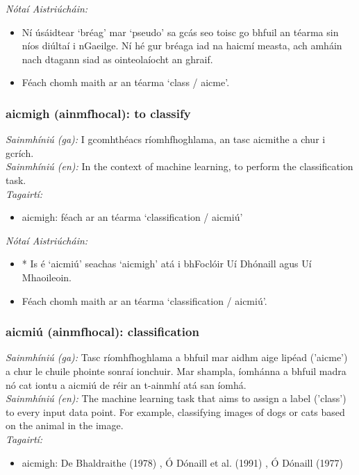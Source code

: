  \noindent \textit{Nótaí Aistriúcháin:}
\begin{itemize}
	\item Ní úsáidtear `bréag' mar `pseudo' sa gcás seo toisc go bhfuil an téarma sin níos diúltaí i nGaeilge. Ní hé gur bréaga iad na haicmí measta, ach amháin nach dtagann siad as ointeolaíocht an ghraif.
	\item Féach chomh maith ar an téarma `class / aicme'.
\end{itemize}


\subsubsection*{aicmigh (ainmfhocal): to classify}
 \noindent \textit{Sainmhíniú (ga):} I gcomhthéacs ríomhfhoghlama, an tasc aicmithe a chur i gcrích.
\\
 \noindent \textit{Sainmhíniú (en):} In the context of machine learning, to perform the classification task.
\\
 \noindent \textit{Tagairtí:}
\begin{itemize}
	\item aicmigh: féach ar an téarma `classification / aicmiú'
\end{itemize}

 \noindent \textit{Nótaí Aistriúcháin:}
\begin{itemize}
	\item * Is é `aicmiú' seachas `aicmigh' atá i bhFoclóir Uí Dhónaill agus Uí Mhaoileoin.
	\item Féach chomh maith ar an téarma `classification / aicmiú'.
\end{itemize}


\subsubsection*{aicmiú (ainmfhocal): classification}
 \noindent \textit{Sainmhíniú (ga):} Tasc ríomhfhoghlama a bhfuil mar aidhm aige lipéad ('aicme') a chur le chuile phointe sonraí ionchuir. Mar shampla, íomhánna a bhfuil madra nó cat iontu a aicmiú de réir an t-ainmhí atá san íomhá.
\\
 \noindent \textit{Sainmhíniú (en):} The machine learning task that aims to assign a label ('class') to every input data point. For example, classifying images of dogs or cats based on the animal in the image.
\\
 \noindent \textit{Tagairtí:}
\begin{itemize}
	\item aicmigh: De Bhaldraithe (1978) \cite{de-bhaldraithe}, Ó Dónaill et al. (1991) \cite{focloir-beag}, Ó Dónaill (1977) \cite{odonaill}
\end{itemize}

